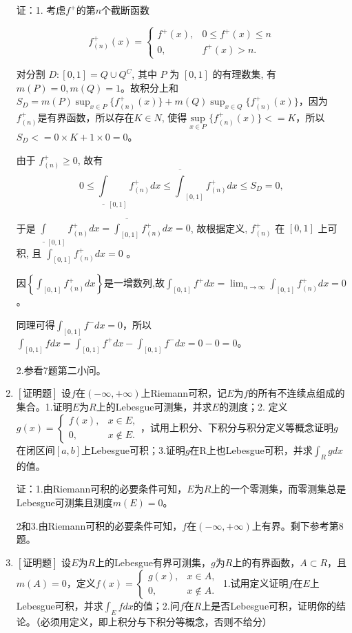 \documentclass{article}
\begin{document}
\begin{enumerate}
证：1. 考虑$f^{+}$的第$n$个截断函数

$$
f_{(n)}^{+}(x)=\left\{\begin{array}{cc}
f^{+}(x), & 0 \leq f^{+}(x) \leq n\\
0, & f^{+}(x) > n .
\end{array}\right.
$$

对分割 $D:[0,1]=Q \cup Q^{C}$, 其中 $P$ 为 $[0,1]$ 的有理数集, 有 $m(P)=0, m(Q)=1$。故积分上和$S_D=m(P)\sup_{x\in P} \{f_{(n)}^{+}(x)\} + m(Q)\sup_{x\in Q} \{f_{(n)}^{+}(x)\}$，因为$f_{(n)}^{+}$是有界函数，所以存在$K \in N$, 使得$\mathop{sup}\limits_{x\in P} \{f_{(n)}^{+}(x)\} <= K$，所以$S_D <= 0\times K + 1\times 0 = 0$。

由于 $f_{(n)}^{+} \geq 0$, 故有
$$
0 \leq \underline{\int}_{[0,1]} f_{(n)}^{+} d x \leq \overline{\int}_{[0,1]} f_{(n)}^{+} d x \leq S_D=0,
$$

于是 $\underline{\int}_{[0, 1]} f_{(n)}^{+} d x=\overline{\int_{[0, 1]}} f_{(n)}^{+} d x=0$, 故根据定义, $f_{(n)}^{+}$ 在 $[0, 1]$ 上可积, 且 $\int_{[0, 1]} f_{(n)}^{+} d x=0$ 。

因$\left\{\int_{[0, 1]} f_{(n)}^{+} d x\right\}$是一增数列,故$\int_{[0, 1]} f^{+} d x=\lim_{n\to \infty}\int_{[0, 1]} f_{(n)}^{+} d x=0$。

同理可得$\int_{[0, 1]} f^{-} d x=0$，所以$\int_{[0, 1]} f d x=\int_{[0, 1]} f^{+} d x-\int_{[0, 1]} f^{-} d x=0-0=0$。

2.参看7题第二小问。

\item $\left[\textbf{证明题}\right]$ 设$f$在$\left(-\infty, +\infty\right)$上Riemann可积，记$E$为$f$的所有不连续点组成的集合。1.证明$E$为$R$上的Lebesgue可测集，并求$E$的测度；2. 定义$g(x)=\left\{\begin{array}{cc}
f(x), & x \in E, \\
0, & x \notin E .
\end{array}\right.$，试用上积分、下积分与积分定义等概念证明$g$在闭区间$[a, b]$上Lebesgue可积；3.证明$g$在R上也Lebesgue可积，并求$\int_R gdx$的值。

证：1.由Riemann可积的必要条件可知，$E$为$R$上的一个零测集，而零测集总是Lebesgue可测集且测度$m(E)=0$。

2和3.由Riemann可积的必要条件可知，$f$在$(-\infty, +\infty)$上有界。剩下参考第8题。

\item $\left[\textbf{证明题}\right]$ 设$E$为$R$上的Lebesgue有界可测集，$g$为$R$上的有界函数，$A\subset R$，且$m(A)=0$，定义$f(x)=\left\{\begin{array}{cc}
g(x), & x \in A, \\
0, & x \notin A .
\end{array}\right.$ 1.试用定义证明$f$在$E$上Lebesgue可积，并求$\int_E fdx$的值；2.问$f$在$R$上是否Lebesgue可积，证明你的结论。（必须用定义，即上积分与下积分等概念，否则不给分）


\end{enumerate}
\end{document}
